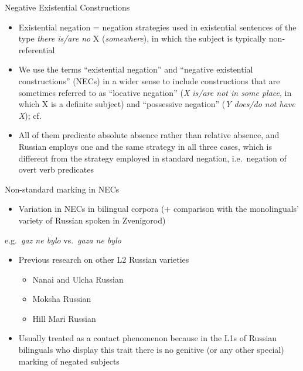 \documentclass[
  ignorenonframetext,
  t]{beamer}
\providecommand{\tightlist}{%
  \setlength{\itemsep}{0pt}\setlength{\parskip}{0pt}}\usepackage{longtable,booktabs,array}
\begin{document}
\begin{frame}{Negative Existential Constructions}
\label{negative-existential-constructions-1}
\begin{itemize}
\tightlist
\item
  Existential negation = negation strategies used in existential
  sentences of the type \emph{there is/are no} X (\emph{somewhere}), in
  which the subject is typically non-referential
\item
  We use the terms ``existential negation'' and ``negative existential
  constructions'' (NECs) in a wider sense to include constructions that
  are sometimes referred to as ``locative negation'' (\emph{X is/are not
  in some place}, in which X is a definite subject) and ``possessive
  negation'' (\emph{Y does/do not have X}); cf.
  \citep[110--111]{veselinova13}
\item
  All of them predicate absolute absence rather than relative absence,
  and Russian employs one and the same strategy in all three cases,
  which is different from the strategy employed in standard negation,
  i.e.~negation of overt verb predicates
\end{itemize}
\end{frame}

\begin{frame}{Non-standard marking in NECs}
\label{non-standard-marking-in-necs}
\begin{itemize}
\tightlist
\item
  Variation in NECs in bilingual corpora (+ comparison with the
  monolinguals' variety of Russian spoken in Zvenigorod)
\end{itemize}

e.g.~\emph{gaz ne bylo} vs.~\emph{gaza ne bylo}

\begin{itemize}
\tightlist
\item
  Previous research on other L2 Russian varieties

  \begin{itemize}
  \tightlist
  \item
    Nanai and Ulcha Russian \citep[27]{stoynova19}
  \item
    Moksha Russian \citep[116]{kashkin20}
  \item
    Hill Mari Russian \citep[39]{kashkin22}
  \end{itemize}
\item
  Usually treated as a contact phenomenon because in the L1s of Russian
  bilinguals who display this trait there is no genitive (or any other
  special) marking of negated subjects
\end{itemize}
\end{frame}
\end{document}
